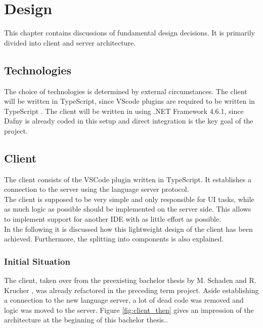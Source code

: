 \section{Design}
This chapter contains discussions of fundamental design decisions.
It is primarily divided into client and server architecture.

\subsection{Technologies}
The choice of technologies is determined by external circumstances. The client will be written in TypeScript, since VScode plugins are required to be written in TypeScript \cite{vscodeAPI}. The client will be written in  \Csharp using .NET Framework 4.6.1, since Dafny is already coded in this setup and direct integration is the key goal of the project.


\subsection{Client}
The client consists of the VSCode plugin written in TypeScript. It establishes a connection to the server using the language server protocol.\\

The client is supposed to be very simple and only responsible for UI tasks, while as much logic as possible should be implemented on the server side. This allows to implement support for another IDE with as little effort as possible. \\

In the following it is discussed how this lightweight design of the client has been achieved.
Furthermore, the splitting into components is also explained.

\subsubsection{Initial Situation}
The client, taken over from the preexisting bachelor thesis by M. Schaden and R. Krucher \cite{ba}, was already refactored in the preceding term project. Aside establishing a connection to the new language server, a lot of dead code was removed and logic was moved to the server.
Figure \ref{fig:client_then} gives an impression of the architecture at the beginning of this bachelor thesis..


